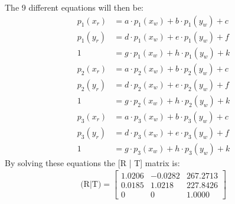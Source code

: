 The 9 different equations will then be:
\begin{align*} 
p_1(x_r) &= a\cdot p_1(x_w) + b\cdot p_1(y_w) + c \\
p_1(y_r) &= d\cdot p_1(x_w) + e\cdot p_1(y_w) + f \\
1 &= g\cdot p_1(x_w) + h\cdot p_1(y_w) + k \\
p_2(x_r) &= a\cdot p_2(x_w) + b\cdot p_2(y_w) + c\\
p_2(y_r) &= d\cdot p_2(x_w) + e\cdot p_2(y_w) + f \\
1 &= g\cdot p_2(x_w) + h\cdot p_2(y_w) + k \\
p_3(x_r) &= a\cdot p_3(x_w) + b\cdot p_3(y_w) + c \\
p_3(y_r) &= d\cdot p_3(x_w) + e\cdot p_3(y_w) + f \\
1 &= g\cdot p_3(x_w) + h\cdot p_3(y_w) + k
\end{align*}
By solving these equations the [R | T] matrix is:
\begin{align*}
\text{(R|T)} = 
\begin{bmatrix}
1.0206 & -0.0282 & 267.2713 \\
0.0185 & 1.0218 & 227.8426 \\
0 & 0 & 1.0000 
\end{bmatrix}
\end{align*}

